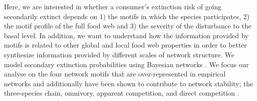 \documentclass[12pt]{article}
\begin{document}
\begin{spacing}{2.0}
    Here, we are interested in whether a consumer's extinction risk of going secondarily extinct depends on 1) the motifs in which the species participates, 2) the motif profile of the full food web and 3) the severity of the disturbance to the basal level. %
    In addition, we want to understand how the information provided by motifs is related to other global and local food web properties in order to better synthesize information provided by different scales of network structure.
    We model secondary extinction probabilities using Bayesian networks \citep{Eklof2013, Haussler2020}. 
    We focus our analyse on the four network motifs that are over-represented in empirical networks and additionally have been shown to contribute to network stability; the three-species chain, omnivory, apparent competition, and direct competition \citep{Stouffer2007, Borrelli2015a, giling2019plant}.
   
    


    

\end{spacing}
\end{document}
